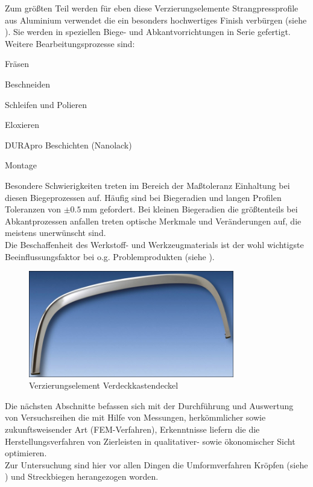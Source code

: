 \documentclass[12pt,a4paper,parskip,twoside,BCOR5mm,headsepline]{scrartcl}
\begin{document}
Zum größten Teil werden für eben diese Verzierungselemente
Strangpressprofile aus Aluminium verwendet die ein besonders hochwertiges Finish verbürgen (siehe ). Sie werden in speziellen Biege- und Abkantvorrichtungen in Serie gefertigt.
 Weitere Bearbeitungsprozesse sind: \begin{itemize*}
 \item Fräsen
 \item Beschneiden
 \item Schleifen und Polieren
 \item Eloxieren
 \item DURApro Beschichten (Nanolack)
 \item Montage
 \end{itemize*}
   Besondere Schwierigkeiten treten im Bereich der Maßtoleranz Einhaltung bei diesen Biegeprozessen auf. Häufig sind bei  Biegeradien und langen Profilen Toleranzen von $\pm \SI{0.5}{\milli\meter}$ gefordert. Bei kleinen Biegeradien die größtenteils bei Abkantprozessen anfallen treten optische Merkmale und Veränderungen auf, die meistens unerwünscht sind.\\
 Die Beschaffenheit des Werkstoff- und Werkzeugmaterials ist der wohl wichtigste Beeinflussungsfaktor bei o.g. Problemprodukten (siehe ).
 


 \begin{figure}[hbtp]
 \centering
 \includegraphics[width=0.8\textwidth]{BauteilNeu}
 \caption{Verzierungselement Verdeckkastendeckel}
 \label{fig:Verdeckkastendeckel}
 \end{figure}

Die nächsten Abschnitte befassen sich mit der Durchführung und Auswertung von Versuchsreihen die mit Hilfe von Messungen, herkömmlicher sowie zukunftsweisender Art (FEM-Verfahren), Erkenntnisse liefern  die die Herstellungsverfahren von Zierleisten  in qualitativer- sowie ökonomischer Sicht  optimieren.\\
Zur Untersuchung   sind hier vor allen Dingen die Umformverfahren  Kröpfen (siehe )  und Streckbiegen herangezogen worden.
\end{document}
